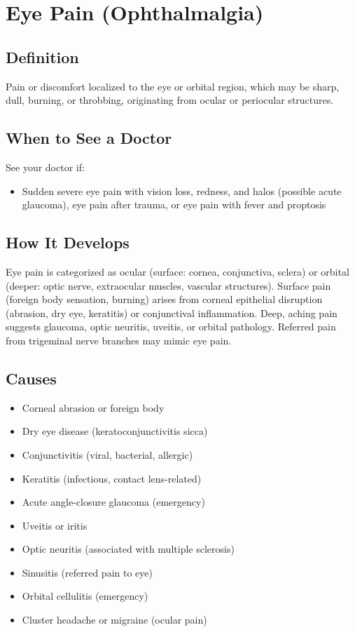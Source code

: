 \chapter{Eye Pain (Ophthalmalgia)}

\section*{Definition}
Pain or discomfort localized to the eye or orbital region, which may be sharp, dull, burning, or throbbing, originating from ocular or periocular structures.

\section*{When to See a Doctor}
See your doctor if:
\begin{itemize}
  \item Sudden severe eye pain with vision loss, redness, and halos (possible acute glaucoma), eye pain after trauma, or eye pain with fever and proptosis
\end{itemize}

\section*{How It Develops}
Eye pain is categorized as ocular (surface: cornea, conjunctiva, sclera) or orbital (deeper: optic nerve, extraocular muscles, vascular structures). Surface pain (foreign body sensation, burning) arises from corneal epithelial disruption (abrasion, dry eye, keratitis) or conjunctival inflammation. Deep, aching pain suggests glaucoma, optic neuritis, uveitis, or orbital pathology. Referred pain from trigeminal nerve branches may mimic eye pain.

\section*{Causes}
\begin{itemize}
  \item Corneal abrasion or foreign body
  \item Dry eye disease (keratoconjunctivitis sicca)
  \item Conjunctivitis (viral, bacterial, allergic)
  \item Keratitis (infectious, contact lens-related)
  \item Acute angle-closure glaucoma (emergency)
  \item Uveitis or iritis
  \item Optic neuritis (associated with multiple sclerosis)
  \item Sinusitis (referred pain to eye)
  \item Orbital cellulitis (emergency)
  \item Cluster headache or migraine (ocular pain)
\end{itemize}

